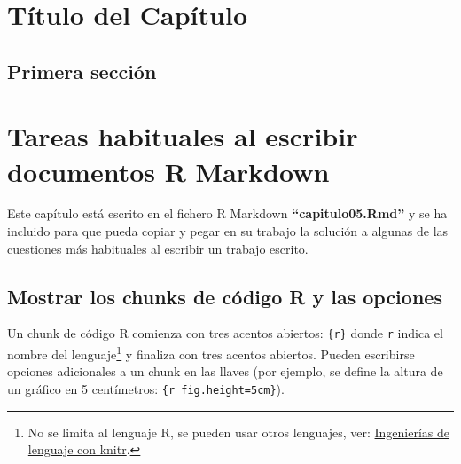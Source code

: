 \documentclass[12pt,a4paper,oneside,]{article}
\def\ifdoblecara{} %
\let\ifdoblecara\undefined %
\def\ifprincipal{} %
\let\rmarkdownfootnote\footnote%
\def\footnote{\protect\rmarkdownfootnote}
\numberwithin{dummy}{section}
\theoremstyle{ocrenumbox}
\theoremstyle{blacknumex}
\theoremstyle{blacknumbox}
\theoremstyle{ocrenum}
\theoremstyle{ocrenum}
\begin{document}
\hypertarget{tuxedtulo-del-capuxedtulo-3}{%
\section{Título del Capítulo}\label{tuxedtulo-del-capuxedtulo-3}}

\hypertarget{primera-secciuxf3n-3}{%
\subsection{Primera sección}\label{primera-secciuxf3n-3}}

\FloatBarrier

\ifdefined\ifprincipal
\else
\setlength{\parindent}{1em}
\pagestyle{fancy}
\setcounter{tocdepth}{4}
\tableofcontents

\nocite{Luque2017,Luque2019,RStudio,R-base2,
R-knitr,R-rmarkdown,R-dplyr,R-ggplot2,Techopedia}

\fi

\ifdefined\ifdoblecara
\fancyhead{}{}
\fancyhead[LE,RO]{\scriptsize\rightmark}
\fancyfoot[LO,RE]{\scriptsize\slshape \leftmark}
\fancyfoot[C]{}
\fancyfoot[LE,RO]{\footnotesize\thepage}
\else
\fancyhead{}{}
\fancyhead[RO]{\scriptsize\rightmark}
\fancyfoot[LO]{\scriptsize\slshape \leftmark}
\fancyfoot[C]{}
\fancyfoot[RO]{\footnotesize\thepage}
\fi

\renewcommand{\headrulewidth}{0.4pt}
\renewcommand{\footrulewidth}{0.4pt}

\hypertarget{tareas-habituales-al-escribir-documentos-r-markdown}{%
\section{Tareas habituales al escribir documentos R
Markdown}\label{tareas-habituales-al-escribir-documentos-r-markdown}}

Este capítulo está escrito en el fichero R Markdown
\textbf{``capitulo05.Rmd''} y se ha incluido para que pueda copiar y
pegar en su trabajo la solución a algunas de las cuestiones más
habituales al escribir un trabajo escrito.

\hypertarget{mostrar-los-chunks-de-cuxf3digo-r-y-las-opciones}{%
\subsection{Mostrar los chunks de código R y las
opciones}\label{mostrar-los-chunks-de-cuxf3digo-r-y-las-opciones}}

Un chunk de código R comienza con tres acentos abiertos:
\texttt{\textasciigrave{}\textasciigrave{}\textasciigrave{}\{r\}} donde
\texttt{r} indica el nombre del lenguaje\footnote{No se limita al
  lenguaje R, se pueden usar otros lenguajes, ver:
  \href{https://rmarkdown.rstudio.com/authoring_knitr_engines.html\%23sql}{Ingenierías
  de lenguaje con knitr}.} y finaliza con tres acentos abiertos. Pueden
escribirse opciones adicionales a un chunk en las llaves (por ejemplo,
se define la altura de un gráfico en 5 centímetros:
\texttt{\textasciigrave{}\textasciigrave{}\textasciigrave{}\{r\ fig.height=\textquotesingle{}5cm\textquotesingle{}\}}).
\end{document}
